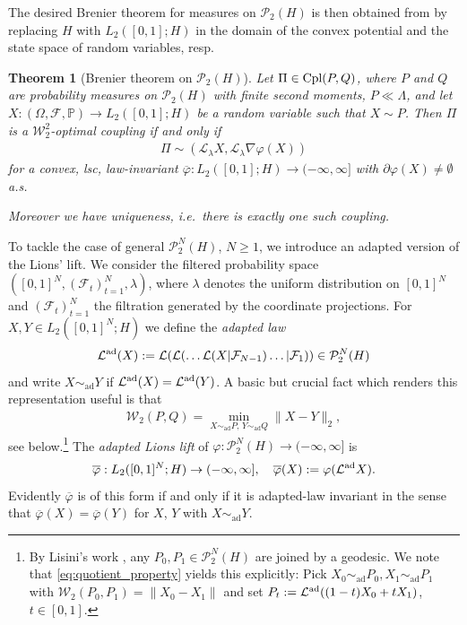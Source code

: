 \documentclass[a4paper]{amsart}
\newtheorem{theorem}{Theorem}
\numberwithin{theorem}{section}
\theoremstyle{definition}
\newcommand{\F}{\mathcal{F}}
\newcommand{\law}{\mathcal{L}}
\newcommand{\cpl}{\textup{Cpl}}
\newcommand{\W}{\mathcal{W}}
\newcommand{\Pc}{\mathcal P}
\newcommand{\simad}{\sim_{\mathrm{ad}}}
\renewcommand{\H}{H}
\renewcommand{\phi}{\varphi}
\newcommand{\lawad}{\law^{\textup{ad}}}
\begin{document}
The desired Brenier theorem for measures on $\Pc_2(H)$ is then obtained from  by replacing $H$ with $L_2([0,1]; H)$  in the domain of the convex potential and the state space of random variables, resp. 


\begin{theorem}[Brenier theorem on $\Pc_2(\H)$]\label{thm:1-coupling_Brenier} 
Let $\Pi \in \cpl(P,Q)$, where $P$ and $Q$ are probability measures on $\mathcal{P}_2(H)$ with finite second moments, $P \ll \Lambda$, and let $X:(\Omega,\mathcal{F},\mathbb{P}) \to L_2([0,1]; H)$ be a random variable such that $X \sim P$.
Then $\Pi$ is a $\W_2^2$-optimal coupling if and only if 
\begin{align} 
\Pi \sim (\law_\lambda X,\law_\lambda \nabla \phi (X))
\end{align}
 for a convex, lsc, law-invariant  $\overline\phi:  L_2([0,1]; H) \to (-\infty, \infty]$ with $  \partial\phi(X) \neq \emptyset $ a.s.

Moreover we have uniqueness, i.e.\ there is exactly one such coupling.
\end{theorem}


To tackle the case of general $\Pc_2^N(H)$, $N\geq 1$, we introduce an adapted  version of the Lions' lift. We consider the filtered probability space $([0,1]^N, (\F_t)_{t=1}^N, \lambda)$, where $\lambda $ denotes the uniform distribution on $[0,1]^N$ and   $(\F_t)_{t=1}^N$ the filtration generated by the coordinate projections. For $X,Y\in L_2([0,1]^N; H)$ we define the \emph{adapted law}
$$\lawad(X):=\law(\law( \ldots \law(X| \F_{N-1}) \ldots | \F_1)) \in \Pc_2^N(H)$$
and write $X\simad Y$ if $\lawad(X)= \lawad(Y)$. A basic but crucial fact which renders this representation useful is that
\begin{align}\label{eq:quotient_property}
    \W_2(P,Q) = \min_{ X \simad P, \, Y \simad Q}    \|X-Y\|_2,
\end{align}
see  below.\footnote{
By Lisini's work \cite{Li07}, any $P_0, P_1\in \Pc_2^N(H)$ are joined by a geodesic. 
 We note that \eqref{eq:quotient_property} yields this explicitly: Pick  $X_0\simad P_0,X_1\simad P_1$ with $\W_2(P_0, P_1) = \|X_0-X_1\|$ and set $P_t:= \lawad((1-t)X_0+tX_1)$, $t\in [0,1]$.}    
 The  \emph{adapted Lions lift} of $\phi:\Pc_2^N(H) \to (-\infty, \infty]$ is
$$   \overline\phi: L_2([0,1]^N; H) \to (-\infty, \infty], \quad \overline\phi(X):= \phi(\lawad X).$$
Evidently $\overline\phi$ is of this form if and only if it is adapted-law invariant in the sense that $\overline\phi(X)=\overline\phi(Y)$ for $X$, $Y$ with $X\simad Y$. 
\end{document}
